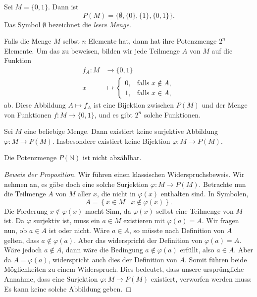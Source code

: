 \documentclass[../main.tex]{subfiles}
\begin{document}
\begin{example}
  Sei $M = \{0, 1\}$. Dann ist
  \[
    P(M) = \{ \emptyset, \{0\}, \{1\}, \{0, 1\}\}.
  \]
  Das Symbol $\emptyset$ bezeichnet die \emph{leere Menge}.
\end{example}

\begin{remark}
  Falls die Menge $M$ selbst $n$ Elemente hat, dann hat ihre
  Potenzmenge $2^{n}$ Elemente. Um das zu beweisen,
  bilden wir jede Teilmenge $A$ von $M$
  auf die Funktion
  \begin{align*}
    f_{A} \colon  M &\to \{0, 1\} \\
     x &\mapsto
      \begin{cases}
        0, & \mbox{falls } x \notin A, \\
        1, & \mbox{falls } x \in A,
      \end{cases}
  \end{align*}
  ab.
  Diese Abbildung $A \mapsto f_{A}$ ist eine Bijektion zwischen
  $P(M)$ und der Menge von Funktionen $f \colon M \to \{0, 1\}$,
  und es gibt $2^{n}$
  solche Funktionen.
\end{remark}

\begin{proposition}[Cantor]\label{prop:cantor}
  Sei $M$ eine beliebige Menge.
  Dann existiert keine surjektive Abbildung $\varphi \colon M \to P(M)$.
  Insbesondere existiert keine Bijektion $\varphi \colon M \to P(M)$.
\end{proposition}

\begin{corollary*}
  Die Potenzmenge $P(\mathbb N)$ ist nicht abzählbar.
\end{corollary*}

\begin{proof}[Beweis der Proposition]
  Wir führen einen klassischen Widerspruchsbeweis.
  Wir nehmen an, es gäbe doch eine solche Surjektion
  $\varphi \colon M \to P(M)$.
  Betrachte nun die Teilmenge $A$ von $M$ aller $x$, die nicht
  in $\varphi(x)$ enthalten sind. In Symbolen,
  \[
    A = \left\{x \in M \mid x \notin \varphi(x)\right\}.
  \]
  Die Forderung $x \notin \varphi(x)$ macht Sinn,
  da $\varphi(x)$ selbst eine Teilmenge von $M$ ist.
  Da $\varphi$ surjektiv ist, muss ein $a \in M$
  existieren mit $\varphi(a) = A$. Wir fragen nun,
  ob $a \in A$ ist oder nicht.
  Wäre $a \in A$, so müsste nach Definition von $A$
  gelten, dass $a \notin \varphi(a)$. Aber das
  widerspricht der Definition von $\varphi(a) = A$.
  Wäre jedoch $a \notin A$, dann wäre die Bedingung
  $a \notin \varphi(a)$ erfüllt, also $a \in A$.
  Aber da $A = \varphi(a)$, widerspricht auch dies
  der Definition von $A$. Somit führen beide Möglichkeiten
  zu einem Widerspruch. Dies bedeutet, dass unsere
  ursprüngliche Annahme, dass eine Surjektion
  $\varphi \colon M \to P(M)$ existiert, verworfen werden muss:
  Es kann keine solche Abbildung geben.
\end{proof}
\end{document}
